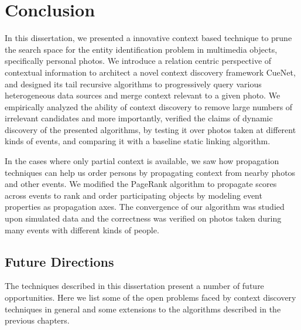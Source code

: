 \chapter{Conclusion}

In this dissertation, we presented a innovative context based technique to prune the search space for the entity identification problem in multimedia objects, specifically personal photos. We introduce a relation centric perspective of contextual information to architect a novel context discovery framework CueNet, and designed its tail recursive algorithms to progressively query various heterogeneous data sources and merge context relevant to a given photo. We empirically analyzed the ability of context discovery to remove large numbers of irrelevant candidates and more importantly, verified the claims of dynamic discovery of the presented algorithms, by testing it over photos taken at different kinds of events, and comparing it with a baseline static linking algorithm. 

In the cases where only partial context is available, we saw how propagation techniques can help us order persons by propagating context from nearby photos and other events. We modified the PageRank algorithm to propagate scores across events to rank and order participating objects by modeling event properties as propagation axes. The convergence of our algorithm was studied upon simulated data and the correctness was verified on photos taken during many events with different kinds of people.

\section{Future Directions}
The techniques described in this dissertation present a number of future opportunities. Here we list some of the open problems faced by context discovery techniques in general and some extensions to the algorithms described in the previous chapters. 


